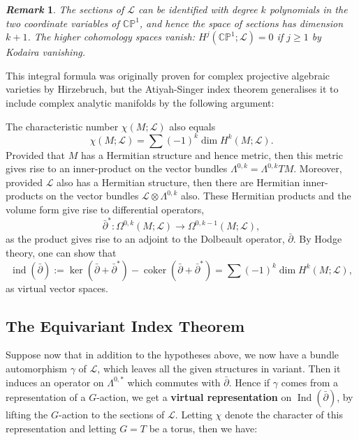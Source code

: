 \documentclass{article}
\newtheorem{remark}{\it Remark\/}
\newcommand{\lra}{\longrightarrow}
\newcommand{\W}{\Omega}
\newcommand{\PP}{\mathbb{P}}
\newcommand{\CC}{\mathbb{C}}
\newcommand{\mcL}{\mathcal{L}}
\DeclareMathOperator{\ind}{ind}
\DeclareMathOperator{\Ind}{Ind}
\DeclareMathOperator{\coker}{coker}
\begin{document}
\begin{remark}
	The sections of $\mcL$ can be identified with degree $k$ polynomials in the two coordinate variables of $\CC\PP^{1}$, and hence the space of sections has dimension $k+1$. The higher cohomology spaces vanish: $H^{j}(\CC\PP^{1}; \mcL) = 0$ if $j \geq 1$ by Kodaira vanishing.
\end{remark}

This integral formula was originally proven for complex projective algebraic varieties by Hirzebruch, but the Atiyah-Singer index theorem generalises it to include complex analytic manifolds by the following argument:

The characteristic number $\chi(M; \mcL)$ also equals
\begin{equation*}
	\chi(M; \mcL) = \sum (-1)^{k} \dim H^{k}(M; \mcL).
\end{equation*}
Provided that $M$ has a Hermitian structure and hence metric, then this metric gives rise to an inner-product on the vector bundles $\Lambda^{0,k} = \Lambda^{0,k}TM$. Moreover, provided $\mcL$ also has a Hermitian structure, then there are Hermitian inner-products on the vector bundles $\mcL \otimes \Lambda^{0,k}$ also. These Hermitian products and the volume form give rise to differential operators,
	\begin{equation*}
		\bar{\partial}^{\ast} : \W^{0,k}(M; \mcL) \lra \W^{0,k-1}(M; \mcL),
	\end{equation*}
as the product gives rise to an adjoint to the Dolbeault operator, $\bar{\partial}$. By Hodge theory, one can show that
	\begin{equation*}
		\ind(\bar{\partial}) := \ker( \bar{\partial} + \bar{\partial}^{\ast} ) - \coker( \bar{\partial} + \bar{\partial}^{\ast} ) =  \sum (-1)^{k} \dim H^{k}(M; \mcL),
	\end{equation*}
as virtual vector spaces.

\subsection{The Equivariant Index Theorem}

Suppose now that in addition to the hypotheses above, we now have a bundle automorphism $\gamma$ of $\mcL$, which leaves all the given structures in variant. Then it induces an operator on $\Lambda^{0,\ast}$ which commutes with $\bar{\partial}$. Hence if $\gamma$ comes from a representation of a $G$-action, we get a \textbf{virtual representation} on $\Ind(\bar{\partial})$, by lifting the $G$-action to the sections of $\mcL$. Letting $\chi$ denote the character of this representation and letting $G = T$ be a torus, then we have:
\end{document}
